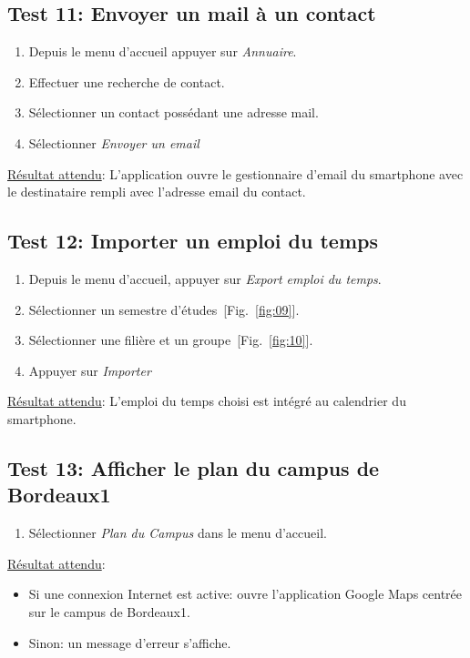   \subsection*{Test 11: Envoyer un mail à un contact}
    \begin{enumerate}
    \item Depuis le menu d'accueil appuyer sur \emph{Annuaire}.
    \item Effectuer une recherche de contact.
    \item Sélectionner un contact possédant une adresse mail.
    \item Sélectionner \emph{Envoyer un email}
    \end{enumerate}

    \underline{Résultat attendu}: L'application ouvre le gestionnaire d'email du smartphone avec le destinataire rempli avec l'adresse email du contact.

  \subsection*{Test 12: Importer un emploi du temps}
    \begin{enumerate}
    \item Depuis le menu d'accueil, appuyer sur \emph{Export emploi du temps}.
    \item Sélectionner un semestre d'études~[Fig.~\ref{fig:09}].
    \item Sélectionner une filière et un groupe~[Fig.~\ref{fig:10}].
    \item Appuyer sur \emph{Importer}
    \end{enumerate}

    \underline{Résultat attendu}: L'emploi du temps choisi est intégré au calendrier du smartphone.

  \subsection*{Test 13: Afficher le plan du campus de Bordeaux1}
    \begin{enumerate}
    \item Sélectionner \emph{Plan du Campus} dans le menu d'accueil.
    \end{enumerate}

    \underline{Résultat attendu}:
    \begin{itemize}
    \item Si une connexion Internet est active: ouvre l'application Google Maps centrée sur le campus de Bordeaux1.
    \item Sinon: un message d'erreur s'affiche.
    \end{itemize}
